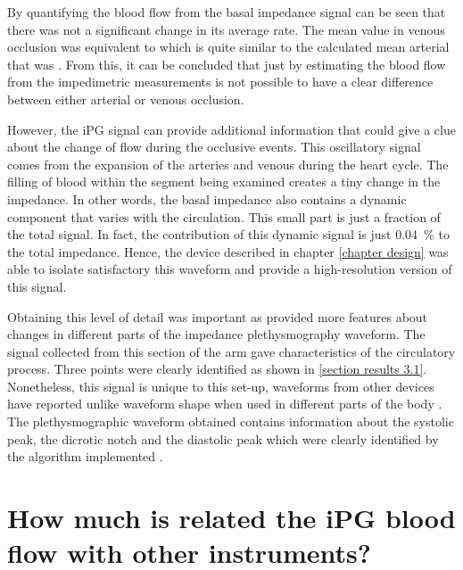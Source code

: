 By quantifying the blood flow from the basal impedance signal can be seen that there was not a significant change in its average rate. The mean value in venous occlusion was equivalent to \flowbasalvenous{} which is quite similar to the calculated mean arterial that was \flowbasalarterial{}. From this, it can be concluded that just by estimating the blood flow from the impedimetric measurements is not possible to have a clear difference between either arterial or venous occlusion.

However, the iPG signal can provide additional information that could give a clue about the change of flow during the occlusive events. This oscillatory signal comes from the expansion of the arteries and venous during the heart cycle. The filling of blood within the segment being examined creates a tiny change in the impedance. In other words, the basal impedance also contains a dynamic component that varies with the circulation. This small part is just a fraction of the total signal. In fact, the contribution of this dynamic signal is just \SI{0.04}{\percent} to the total impedance. Hence, the device described in chapter \ref{chapter design} was able to isolate satisfactory this waveform and provide a high-resolution version of this signal.

Obtaining this level of detail was important as provided more features about changes in different parts of the impedance plethysmography waveform. The signal collected from this section of the arm gave characteristics of the circulatory process. Three points were clearly identified as shown in \ref{section results 3.1}. Nonetheless, this signal is unique to this set-up, waveforms from other devices have reported unlike waveform shape when used in different parts of the body . The plethysmographic waveform obtained contains information about the systolic peak, the dicrotic notch and the diastolic peak which were clearly identified by the algorithm implemented . 


  

\section{How much is related the iPG blood flow with other instruments?} %
\label{section discussion 4}


